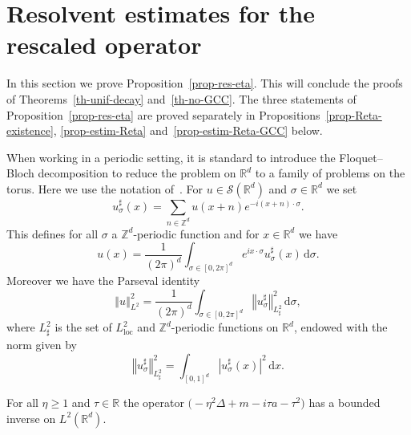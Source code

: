 \documentclass[AHL,Unicode,longabstracts]{cedram}
\newcommand{\abs}[1]{\left\vert #1\right\vert}
\newcommand{\nr}[1]{\left\Vert #1\right\Vert}
\renewcommand{\geq}{\geqslant}
\newcommand{\1}{\mathds 1}
\newcommand{\loc}{{\mathrm{loc}}}
\newcommand{\R}{\mathbb{R}}
\newcommand{\D}{\Delta}
\newcommand{\s}{\sigma}
\renewcommand{\t}{\tau}
\newcommand{\Sc}{{\mathcal S}}
\newcommand{\dd}{\mathrm{d}}
\newcommand{\dx}{\dd x}
\newcommand{\dsigma}{\dd \sigma}
\begin{document}
\section{Resolvent estimates for the rescaled operator} \label{sec-resolvent-L2}

In this section we prove Proposition~\ref{prop-res-eta}. This will conclude the proofs of Theorems~\ref{th-unif-decay} and~\ref{th-no-GCC}. The three statements of Proposition~\ref{prop-res-eta} are proved separately in Propositions~\ref{prop-Reta-existence}, \ref{prop-estim-Reta} and~\ref{prop-estim-Reta-GCC} below.%

When working in a periodic setting, it is standard to introduce the Floquet--Bloch decomposition to reduce the problem on $\R^d$ to a family of problems on the torus. Here we use the notation of~\cite{JolyRo18}. For $u \in \Sc(\R^d)$ and $\s \in \R^d$ we set
\[
u^\sharp_\s (x) = \sum_{n \in \mathbb Z^d} u(x + n) e^{-i(x+n)\cdot \s}.
\]
This defines for all $\s$ a $\mathbb Z^d$-periodic function and for $x \in \R^d$ we have
\[
u(x) = \frac 1 {(2\pi)^d} \int_{\s \in [0,2\pi]^d} e^{ix\cdot \s} u^\sharp_\s(x) \, \dsigma.
\]
Moreover we have the Parseval identity
\[
\nr{u}_{L^2}^2 = \frac 1 {(2\pi)^d} \int_{\s \in [0,2\pi]^d} \nr{u_\s^\sharp}_{L^2_\sharp}^2 \, \dsigma,
\]
where $L^2_\sharp$ is the set of $L^2_\loc$ and $\mathbb Z^d$-periodic functions on $\R^d$, endowed with the norm given by
\[
\nr{u_\s^\sharp}_{L^2_\sharp}^2 = \int_{[0,1]^d} \abs{u_\s^\sharp(x)}^2 \, \dx.
\]

\begin{prop}\label{prop-Reta-existence}
For all $\eta \geq 1$ and $\t \in \R$ the operator $\big(-\eta^2 \D + m - i\t a - \t^2 \big)$ has a bounded inverse on $L^2(\R^d)$.
\end{prop}
\end{document}
